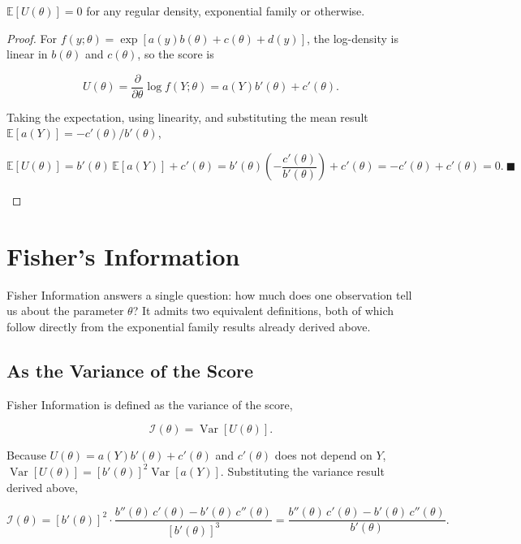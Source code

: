 \begin{theorem}
$\mathbb{E}[U(\theta)] = 0$ for any regular density, exponential family or otherwise.
\end{theorem}
\begin{proof}
For $f(y;\theta)=\exp[a(y)b(\theta)+c(\theta)+d(y)]$, the log-density is linear in $b(\theta)$ and $c(\theta)$, so the score is
\begin{mathbox}
\[
U(\theta) = \frac{\partial}{\partial\theta}\log f(Y;\theta) = a(Y)b'(\theta)+c'(\theta).
\]
\end{mathbox}
Taking the expectation, using linearity, and substituting the mean result $\mathbb{E}[a(Y)]=-c'(\theta)/b'(\theta)$,
\begin{mathbox}
\[
\mathbb{E}[U(\theta)] = b'(\theta)\,\mathbb{E}[a(Y)]+c'(\theta) = b'(\theta)\left(-\frac{c'(\theta)}{b'(\theta)}\right)+c'(\theta) = -c'(\theta)+c'(\theta) = 0.\ \blacksquare
\]
\end{mathbox}
\end{proof}

\section{Fisher's Information}
Fisher Information answers a single question: how much does one observation tell us about the parameter $\theta$? It admits two equivalent definitions, both of which follow directly from the exponential family results already derived above.

\subsection*{As the Variance of the Score}
Fisher Information is defined as the variance of the score,
\begin{mathbox}
\[
\mathcal{I}(\theta) = \operatorname{Var}[U(\theta)].
\]
\end{mathbox}
Because $U(\theta) = a(Y)b'(\theta)+c'(\theta)$ and $c'(\theta)$ does not depend on $Y$, $\operatorname{Var}[U(\theta)] = [b'(\theta)]^2\operatorname{Var}[a(Y)]$. Substituting the variance result derived above,
\begin{mathbox}
\[
\mathcal{I}(\theta) = [b'(\theta)]^2\cdot\frac{b''(\theta)\,c'(\theta)-b'(\theta)\,c''(\theta)}{[b'(\theta)]^3} = \frac{b''(\theta)\,c'(\theta)-b'(\theta)\,c''(\theta)}{b'(\theta)}.
\]
\end{mathbox}

